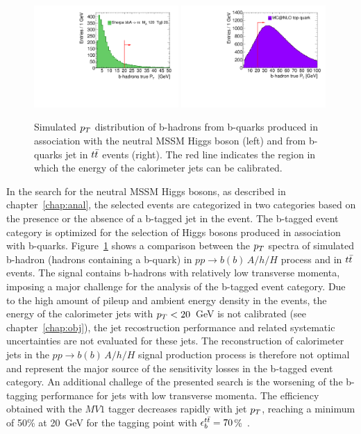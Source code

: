 \begin{figure}[tp]
     \begin{center}

            \includegraphics[width=0.49\textwidth]{figure/trackjet/b_pt_distro2.pdf}
            \includegraphics[width=0.49\textwidth]{figure/trackjet/top_pt_distro.pdf}

    \end{center}
    \caption{Simulated $p_{T}$ distribution of b-hadrons from b-quarks produced in association with the neutral MSSM Higgs boson 
	(left) 	and from b-quarks jet in  $t\bar{t}$ events (right). 
	The red line indicates the region in which the energy of the calorimeter jets can be calibrated.}
   \label{fig:bjetDistro}
\end{figure}


In the search for the neutral MSSM Higgs bosons, as described in chapter~\ref{chap:anal}, the selected events are categorized 
in two categories based on the presence or the absence of a b-tagged jet in the event. The b-tagged event category 
is optimized for the selection of Higgs bosons produced in association with b-quarks. Figure~\ref{fig:bjetDistro} shows a comparison 
between the $p_{T}$ spectra of simulated b-hadron (hadrons containing a b-quark) in $pp\rightarrow b(b)\,A/h/H$ process  and in $t\bar{t}$ events.
The signal contains  b-hadrons with relatively low transverse momenta, imposing a  major challenge 
for the analysis of the b-tagged event category. Due to the high amount of pileup and ambient energy density in the events, 
the energy of the calorimeter jets with $p_{T}<20$~GeV is not calibrated (see chapter~\ref{chap:obj}), the jet recostruction performance 
and related systematic uncertainties are not evaluated for these jets. The reconstruction of calorimeter jets in the $pp\rightarrow b(b)\,A/h/H$ 
signal production process is therefore not optimal and represent the major source of the sensitivity losses 
in the b-tagged event category.
An additional challege of the presented search is the worsening of the  b-tagging performance for jets with low transverse momenta. 
The efficiency obtained with the $MV1$ tagger decreases  rapidly  with jet $p_{T}$, reaching a minimum of 50\% at 
20~GeV for the tagging point with $\epsilon_b^{t\bar{t}}=70$\%~\cite{BtaggingScaleFactors,BtaggingScaleFactorsNew}.

